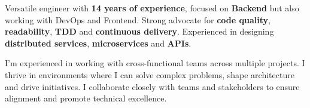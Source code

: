 \documentclass[10pt,a4paper,ragged2e,withhyper]{altacv}
\newcommand{\accentbold}[1]{\textbf{\textcolor{accent}{#1}}}
\begin{document}
\begin{paracol}{2}




\switchcolumn

%

%
%
%


Versatile engineer with \accentbold{14 years of experience}, focused on \accentbold{Backend} but also working with DevOps and Frontend. Strong advocate for \accentbold{code quality}, \accentbold{readability}, \accentbold{TDD} and \accentbold{continuous delivery}. Experienced in designing \accentbold{distributed services}, \accentbold{microservices} and \accentbold{APIs}.

\medskip

I'm experienced in working with cross-functional teams across multiple projects. I thrive in environments where I can solve complex problems, shape architecture and drive initiatives. I collaborate closely with teams and stakeholders to ensure alignment and promote technical excellence.





\end{paracol}
\end{document}
